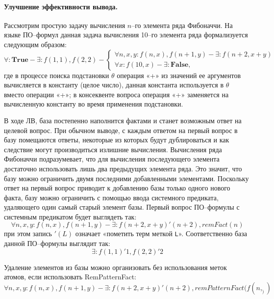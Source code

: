 \paragraph{Улучшение эффективности вывода.} Рассмотрим простую задачу вычисления $n$--го элемента ряда Фибоначчи. На языке ПО--формул данная задача вычисления 10--го элемента ряда формализуется следующим образом:
\begin{equation}
	\forall\colon\boldsymbol{True} - \exists\colon f(1,1), f(2,2) -
	\left\lbrace
	\begin{array}{l}
		\forall n,x,y\colon f(n,x),f(n+1,y) - \exists\colon f(n+2,x+y) \\
		\forall x\colon f(10,x) - \exists\colon \boldsymbol{False},
	\end{array}\right.
\end{equation}
где в процессе поиска подстановки $\theta$ операция «+» из значений ее аргументов вычисляется в константу (целое число), данная константа используется в $\theta$ вместо операции «+»; в консеквенте вопроса операция «+» заменяется на вычисленную константу во время применения подстановки.

В ходе ЛВ, база постепенно наполнится фактами и станет возможным ответ на целевой вопрос. При обычном выводе, с каждым ответом на первый вопрос в базу помещаются ответы, некоторые из которых будут дублироваться и как следствие могут производиться излишние вычисления. Вычисления ряда Фибоначчи подразумевает, что для вычисления последующего элемента достаточно использовать лишь два предыдущих элемента ряда. Это значит, что базу можно ограничить двумя последними добавленными элементами. Поскольку ответ на первый вопрос приводит к добавлению базы только одного нового факта, базу можно ограничить с помощью ввода системного предиката, удаляющего один самый старый элемент базы. Первый вопрос ПО--формулы с системным предикатом будет выглядеть так:
\begin{equation}
	\forall n,x,y\colon f(n,x),f(n+1,y) - \exists\colon f(n+2,x+y)'(n+2), remFact(n)
\end{equation}
при этом запись $'(L)$ означает «пометить терм меткой \texttt{L}». Соответственно база данной ПО--формулы выглядит так:
\begin{equation}
\exists\colon f(1,1)'1, f(2,2)'2
\end{equation}

Удаление элементов из базы можно организовать без использования меток атомов, если использовать RemPatternFact:
\begin{equation}
	\forall n,x,y\colon f(n,x),f(n+1,y) - \exists\colon f(n+2,x+y)'(n+2), remPatternFact(f(n,_))
\end{equation}


